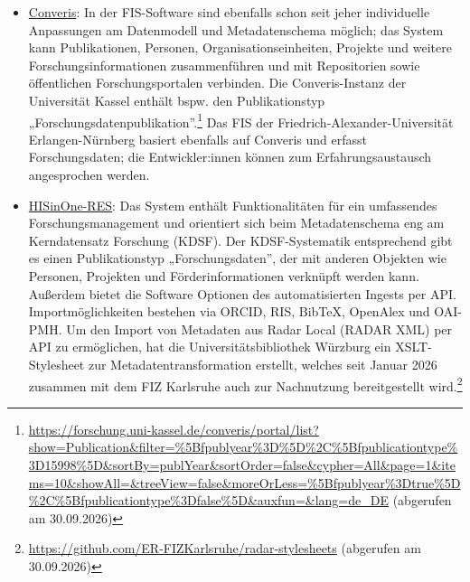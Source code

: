 \documentclass[
  ngerman,
  letterpaper,
  DIV=11]{scrreprt}
\newcounter{none} %
\begin{document}
\begin{itemize}
  Beschreibung von Forschungsdaten aus dem institutionellen Repositorium
  einer Einrichtung übernimmt. Derzeit unterstützt Elements
  Integrationen von DSpace, EPrints, Hyrax und Figshare for
  Institutions. Mittels der Elements-Benutzeroberfläche lassen sich
  Metadaten zur Beschreibung von Forschungsdaten hinzufügen; alternativ
  können sie über die Elements-API aus anderen strukturierten
  Datenquellen bezogen werden, sofern entsprechende Zugriffsrechte
  vorliegen.
\item
  \href{https://clarivate.com/academia-government/ko/scientific-and-academic-research/research-funding-analytics/converis/}{Converis}:
  In der FIS-Software sind ebenfalls schon seit jeher individuelle
  Anpassungen am Datenmodell und Metadatenschema möglich; das System
  kann Publikationen, Personen, Organisationseinheiten, Projekte und
  weitere Forschungsinformationen zusammenführen und mit Repositorien
  sowie öffentlichen Forschungsportalen verbinden. Die Converis-Instanz
  der Universität Kassel enthält bspw. den Publikationstyp
  „Forschungsdatenpublikation''.\footnote{\url{https://forschung.uni-kassel.de/converis/portal/list?show=Publication&filter=\%5Bfpublyear\%3D\%5D\%2C\%5Bfpublicationtype\%3D15998\%5D&sortBy=publYear&sortOrder=false&cypher=All&page=1&items=10&showAll=&treeView=false&moreOrLess=\%5Bfpublyear\%3Dtrue\%5D\%2C\%5Bfpublicationtype\%3Dfalse\%5D&auxfun=&lang=de_DE}
    (abgerufen am 30.09.2026)} Das FIS der
  Friedrich-Alexander-Universität Erlangen-Nürnberg basiert ebenfalls
  auf Converis und erfasst Forschungsdaten; die Entwickler:innen können
  zum Erfahrungsaustausch angesprochen werden.
\item
  \href{https://www.his.de/hisinone/forschungsmanagement}{HISinOne-RES}:
  Das System enthält Funktionalitäten für ein umfassendes
  Forschungsmanagement und orientiert sich beim Metadatenschema eng am
  Kerndatensatz Forschung (KDSF). Der KDSF-Systematik entsprechend gibt
  es einen Publikationstyp „Forschungsdaten'', der mit anderen Objekten
  wie Personen, Projekten und Förderinformationen verknüpft werden kann.
  Außerdem bietet die Software Optionen des automatisierten Ingests per
  API. Importmöglichkeiten bestehen via ORCID, RIS, BibTeX, OpenAlex und
  OAI-PMH. Um den Import von Metadaten aus Radar Local (RADAR XML) per
  API zu ermöglichen, hat die Universitätsbibliothek Würzburg ein
  XSLT-Stylesheet zur Metadatentransformation erstellt, welches seit
  Januar 2026 zusammen mit dem FIZ Karlsruhe auch zur Nachnutzung
  bereitgestellt wird.\footnote{\url{https://github.com/ER-FIZKarlsruhe/radar-stylesheets}
    (abgerufen am 30.09.2026)}
\end{itemize}
\end{document}
